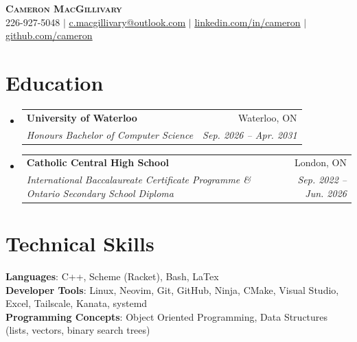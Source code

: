 \documentclass[letterpaper,11pt]{article}
\makeatletter
\newcommand{\resumeSubheading}[4]{
  \vspace{-2pt}\item
    \begin{tabular*}{0.97\textwidth}[t]{l@{\extracolsep{\fill}}r}
      \textbf{#1} & #2 \\
      \textit{\small#3} & \textit{\small #4} \\
    \end{tabular*}\vspace{-7pt}
}
\newcommand{\resumeSubHeadingListStart}{\begin{itemize}[leftmargin=0.15in, label={}]}
\newcommand{\resumeSubHeadingListEnd}{\end{itemize}}
\makeatother
\begin{document}

\begin{center}
    \textbf{\Huge \scshape Cameron MacGillivary} \\ \vspace{1pt}
    \small 226-927-5048 $|$ \href{mailto:c.macgillivary@outlook.com}{\underline{c.macgillivary@outlook.com}} $|$ 
    \href{https://www.linkedin.com/in/cameron-macgillivary-93a882434/}{\underline{linkedin.com/in/cameron}} $|$
    \href{https://github.com/c-macgillivary}{\underline{github.com/cameron}}
\end{center}


\section{Education}
  \resumeSubHeadingListStart
    \resumeSubheading
      {University of Waterloo}{Waterloo, ON}
      {Honours Bachelor of Computer Science}{Sep. 2026 -- Apr. 2031}
    \resumeSubheading
      {Catholic Central High School}{London, ON}
      {International Baccalaureate Certificate Programme \& Ontario Secondary School Diploma}{Sep. 2022 -- Jun. 2026}
  \resumeSubHeadingListEnd


%
\section{Technical Skills}
 \begin{itemize}[leftmargin=0.15in, label={}]
    \small{\item{
     \textbf{Languages}{: C++, Scheme (Racket), Bash, LaTex} \\
     \textbf{Developer Tools}{: Linux, Neovim, Git, GitHub, Ninja, CMake, Visual Studio, Excel, Tailscale, Kanata, systemd} \\
     \textbf{Programming Concepts}{: Object Oriented Programming, Data Structures (lists, vectors, binary search trees)}
    }}
 \end{itemize}
\end{document}
